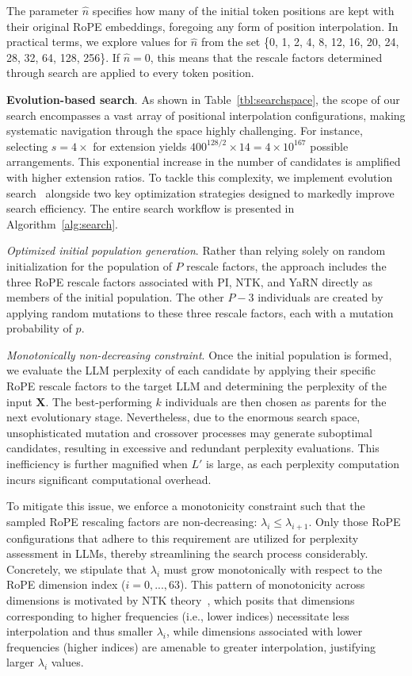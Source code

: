 The parameter $\hat{n}$ specifies how many of the initial token positions are kept with their original RoPE embeddings, foregoing any form of position interpolation. In practical terms, we explore values for $\hat{n}$ from the set \{0, 1, 2, 4, 8, 12, 16, 20, 24, 28, 32, 64, 128, 256\}. If $\hat{n}=0$, this means that the rescale factors determined through search are applied to every token position.

\textbf{Evolution-based search}. As shown in Table~\ref{tbl:searchspace}, the scope of our search encompasses a vast array of positional interpolation configurations, making systematic navigation through the space highly challenging. For instance, selecting $s=4\times$ for extension yields $400^{128/2}\times14 = 4\times10^{167}$ possible arrangements. This exponential increase in the number of candidates is amplified with higher extension ratios. To tackle this complexity, we implement evolution search~\cite{guo2020single} alongside two key optimization strategies designed to markedly improve search efficiency. The entire search workflow is presented in Algorithm~\ref{alg:search}.

\textit{Optimized initial population generation}. Rather than relying solely on random initialization for the population of $P$ rescale factors, the approach includes the three RoPE rescale factors associated with PI, NTK, and YaRN directly as members of the initial population. The other $P-3$ individuals are created by applying random mutations to these three rescale factors, each with a mutation probability of $p$.

\textit{Monotonically non-decreasing constraint}. Once the initial population is formed, we evaluate the LLM perplexity of each candidate by applying their specific RoPE rescale factors to the target LLM and determining the perplexity of the input $\mathbf{X}$. The best-performing $k$ individuals are then chosen as parents for the next evolutionary stage. Nevertheless, due to the enormous search space, unsophisticated mutation and crossover processes may generate suboptimal candidates, resulting in excessive and redundant perplexity evaluations. This inefficiency is further magnified when $L'$ is large, as each perplexity computation incurs significant computational overhead.

To mitigate this issue, we enforce a monotonicity constraint such that the sampled RoPE rescaling factors are non-decreasing: $\lambda_i\le \lambda_{i+1}$. Only those RoPE configurations that adhere to this requirement are utilized for perplexity assessment in LLMs, thereby streamlining the search process considerably. Concretely, we stipulate that $\lambda_i$ must grow monotonically with respect to the RoPE dimension index ($i = 0, ..., 63$). This pattern of monotonicity across dimensions is motivated by NTK theory~\cite{jacot2018neural,tancik2020fourier,ntk}, which posits that dimensions corresponding to higher frequencies (i.e., lower indices) necessitate less interpolation and thus smaller $\lambda_i$, while dimensions associated with lower frequencies (higher indices) are amenable to greater interpolation, justifying larger $\lambda_i$ values.

